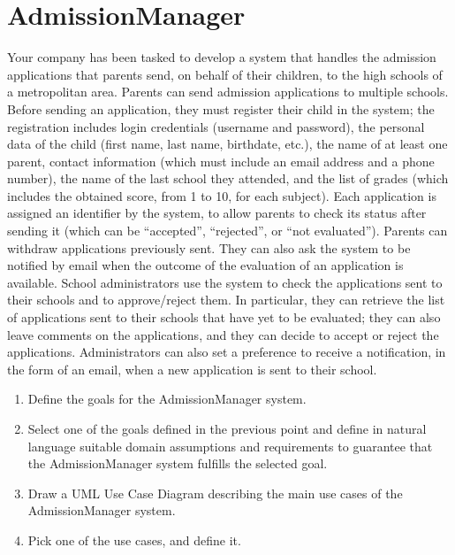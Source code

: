 \documentclass[12pt, a4paper]{report}
\newtheorem[style=M,bodystyle=\normalfont]{theorem}{Theorem}
\newtheorem[style=M,bodystyle=\normalfont]{corollary}{Corollary}
\newtheorem[style=M,bodystyle=\normalfont]{lemma}{Lemma}
\newtheorem[style=M,bodystyle=\normalfont]{definition}{Definition}
\begin{document}
    \section{AdmissionManager}
        Your company has been tasked to develop a system that handles the admission applications that parents send, on behalf of their children, to the high schools of a metropolitan
        area. Parents can send admission applications to multiple schools. Before sending an application, they must register their child in the system; the registration includes 
        login credentials (username and password), the personal data of the child (first name, last name, birthdate, etc.), the name of at least one parent, contact information 
        (which must include an email address and a phone number), the name of the last school they attended, and the list of grades (which includes the obtained score, from 1 to 10, 
        for each subject). Each application is assigned an identifier by the system, to allow parents to check its status after sending it (which can be “accepted”, “rejected”, or 
        “not evaluated”). Parents can withdraw applications previously sent. They can also ask the system to be notified by email when the outcome of the evaluation of an application
        is available. School administrators use the system to check the applications sent to their schools and to approve/reject them. In particular, they can retrieve the list of 
        applications sent to their schools that have yet to be evaluated; they can also leave comments on the applications, and they can decide to accept or reject the applications.
        Administrators can also set a preference to receive a notification, in the form of an email, when a new application is sent to their school.
        \begin{enumerate}
            \item Define the goals for the AdmissionManager system.
            \item Select one of the goals defined in the previous point and define in natural language suitable domain assumptions and requirements to guarantee that the 
                AdmissionManager system fulfills the selected goal.
            \item Draw a UML Use Case Diagram describing the main use cases of the AdmissionManager system.
            \item Pick one of the use cases, and define it. 
        \end{enumerate}
\end{document}
